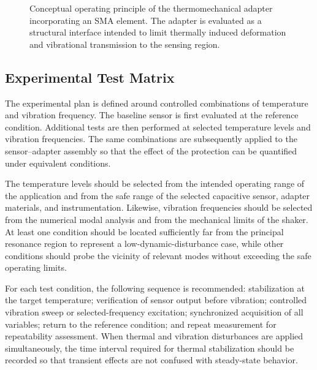\documentclass[conference]{IEEEtran}
\begin{document}

\begin{figure}[t]
\centering
{}
\caption{Conceptual operating principle of the thermomechanical adapter incorporating an SMA element. The adapter is evaluated as a structural interface intended to limit thermally induced deformation and vibrational transmission to the sensing region.}
\label{fig:adapter_concept}
\end{figure}

\subsection{Experimental Test Matrix}

The experimental plan is defined around controlled combinations of temperature and vibration frequency. The baseline sensor is first evaluated at the reference condition. Additional tests are then performed at selected temperature levels and vibration frequencies. The same combinations are subsequently applied to the sensor--adapter assembly so that the effect of the protection can be quantified under equivalent conditions.

The temperature levels should be selected from the intended operating range of the application and from the safe range of the selected capacitive sensor, adapter materials, and instrumentation. Likewise, vibration frequencies should be selected from the numerical modal analysis and from the mechanical limits of the shaker. At least one condition should be located sufficiently far from the principal resonance region to represent a low-dynamic-disturbance case, while other conditions should probe the vicinity of relevant modes without exceeding the safe operating limits.

For each test condition, the following sequence is recommended: stabilization at the target temperature; verification of sensor output before vibration; controlled vibration sweep or selected-frequency excitation; synchronized acquisition of all variables; return to the reference condition; and repeat measurement for repeatability assessment. When thermal and vibration disturbances are applied simultaneously, the time interval required for thermal stabilization should be recorded so that transient effects are not confused with steady-state behavior.
\end{document}
